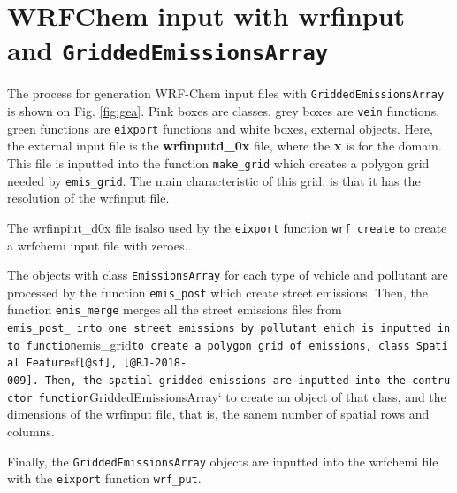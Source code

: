 \documentclass[12pt,graybox,envcountchap,sectrefs]{krantz}
\theoremstyle{definition}
\theoremstyle{definition}
\theoremstyle{definition}
\theoremstyle{remark}
\begin{document}
\section{\texorpdfstring{WRFChem input with wrfinput and
\texttt{GriddedEmissionsArray}}{WRFChem input with wrfinput and GriddedEmissionsArray}}\label{wrfchem-input-with-wrfinput-and-griddedemissionsarray}

The process for generation WRF-Chem input files with
\texttt{GriddedEmissionsArray} is shown on Fig. \ref{fig:gea}. Pink
boxes are classes, grey boxes are \texttt{vein} functions, green
functions are \texttt{eixport} functions and white boxes, external
objects. Here, the external input file is the \textbf{wrfinputd\_0x}
file, where the \textbf{x} is for the domain. This file is inputted into
the function \texttt{make\_grid} which creates a polygon grid needed by
\texttt{emis\_grid}. The main characteristic of this grid, is that it
has the resolution of the wrfinput file.

The wrfinpiut\_d0x file isalso used by the \texttt{eixport} function
\texttt{wrf\_create} to create a wrfchemi input file with zeroes.

The objects with class \texttt{EmissionsArray} for each type of vehicle
and pollutant are processed by the function \texttt{emis\_post} which
create street emissions. Then, the function \texttt{emis\_merge} merges
all the street emissions files from
\texttt{emis\_post\_\ into\ one\ street\ emissions\ by\ pollutant\ ehich\ is\ inputted\ into\ function}emis\_grid\texttt{to\ create\ a\ polygon\ grid\ of\ emissions,\ class\ Spatial\ Feature}sf\texttt{{[}@sf{]},\ {[}@RJ-2018-009{]}.\ Then,\ the\ spatial\ gridded\ emissions\ are\ inputted\ into\ the\ contructor\ function}GriddedEmissionsArray`
to create an object of that class, and the dimensions of the wrfinput
file, that is, the sanem number of spatial rows and columns.

Finally, the \texttt{GriddedEmissionsArray} objects are inputted into
the wrfchemi file with the \texttt{eixport} function \texttt{wrf\_put}.
\end{document}
